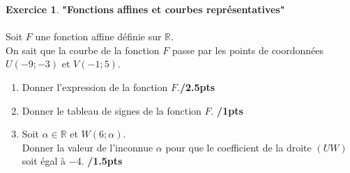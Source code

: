 \documentclass[a4paper,11pt]{article}
\theoremstyle{definition}
\newtheorem{exo}{Exercice}
\newcommand{\R}{\mathbb{R}}
\begin{document}
\begin{exo}\textbf{"Fonctions affines et courbes représentatives"}\\\hfil\\
Soit $F$ une fonction affine définie sur $\R$.\hfill\\[0.2cm]

On sait que la courbe de la fonction $F$ passe par les points de coordonnées $U(-9;-3)$ et $V(-1;5)$.\hfill\\[0.2cm]
\begin{enumerate}
	\item Donner l'expression de la fonction $F$.\hfill\textbf{/2.5pts}
	\item Donner le tableau de signes de la fonction $F$. \hfill\textbf{/1pts}
	\item Soit $\alpha\in\R$ et $W(6;\alpha)$. \\Donner la valeur de l'inconnue $\alpha$ pour que le coefficient de la droite $\left(UW\right)$ soit égal à $-4$. \hfill\textbf{/1.5pts}
	
\end{enumerate}

\end{exo}
\end{document}
